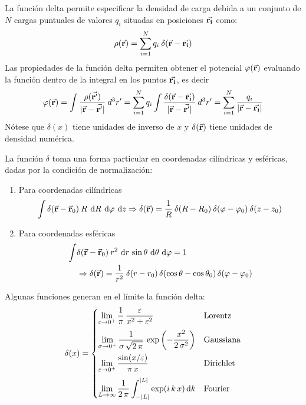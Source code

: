 \documentclass[12pt]{beamer}
\begin{document}
La función delta permite especificar la densidad de carga debida a un conjunto de $N$ cargas puntuales de valores $q_{i}$ situadas en posiciones $\va{r_{i}}$  como:
\begin{equation}
\rho (\va{r}) = \sum_{i=1}^{N} q_{i} \: \delta(\va{r} - \va{r_{i}})
\label{eq:ecuacion_A_04}
\end{equation}
Las propiedades de la función delta permiten obtener el potencial $\varphi(\va{r})$ evaluando la función dentro de la integral en los puntos $\va{r_{i}}$, es decir
\begin{equation}
\varphi(\va{r}) = \int \dfrac{\rho(\va{r^{\prime}})}{\vert \va{r} - \va{r^{\prime}} \vert} \: d^{3}r^{\prime} = \sum_{i=1}^{N} q_{i} \int \dfrac{\delta ( \va{r} - \va{r_{i}})}{\vert \va{r} - \va{r^{\prime}} \vert} \: d^{3}r^{\prime} = \sum_{i=1}^{N} \dfrac{q_{i}}{\vert \va{r} - \va{r_{i}} \vert}
\label{eq:ecuacion_A_05}
\end{equation}
Nótese que $\delta (x)$ tiene unidades de inverso de $x$ y $\delta (\va{r})$ tiene unidades de densidad numérica.
\par
La función $\delta$ toma una forma particular en coordenadas cilíndricas y esféricas, dadas por la condición de normalización:
\begin{enumerate}
\item Para coordenadas cilíndricas
\begin{equation}
\int \delta (\va{r} - \va{r}_{0}) \: R \: \dd{R} \: \dd{\varphi} \: \dd{z} \Rightarrow \delta (\va{r}) =  \dfrac{1}{R} \: \delta (R - R_{0}) \: \delta (\varphi - \varphi_{0}) \: \delta (z - z_{0})
\end{equation}
\item Para coordenadas esféricas
\begin{equation}
\begin{aligned}
\int & \delta (\va{r} - \va{r}_{0}) \: r^{2} \, \dd{r} \, \sin \theta \, \dd{\theta} \, \dd{\varphi} = 1 \\
&\Rightarrow \delta (\va{r}) = \dfrac{1}{r^{2}} \: \delta (r - r_{0}) \, \delta (\cos \theta - \cos \theta_{0}) \, \delta (\varphi - \varphi_{0})
\end{aligned}
\end{equation}
\end{enumerate}
Algunas funciones generan en el límite la función delta:
\begin{align*}
\delta(x) = \begin{cases}
\displaystyle
\lim_{\varepsilon \to 0^{+}} \dfrac{1}{\pi} \, \dfrac{\varepsilon}{x^{2} + \varepsilon^{2}} & \mbox{Lorentz} \\[1em]
\displaystyle
\lim_{\sigma \to 0^{+}} \dfrac{1}{\sigma \, \sqrt{2 \, \pi}} \, \exp \left( - \dfrac{x^{2}}{2 \, \sigma^{2}} \right) & \mbox{Gaussiana} \\[1em]
\displaystyle \lim_{\varepsilon \to 0^{+}} \dfrac{\sin(x / \varepsilon)}{ \pi \, x} & \mbox{Dirichlet} \\[1em]
\displaystyle \lim_{L \to \infty} \dfrac{1}{2 \, \pi} \int_{- \abs{L}}^{\abs{L}} \exp(i \, k \, x) \dd{k} & \mbox{Fourier}
\end{cases}
\end{align*}
\end{document}
